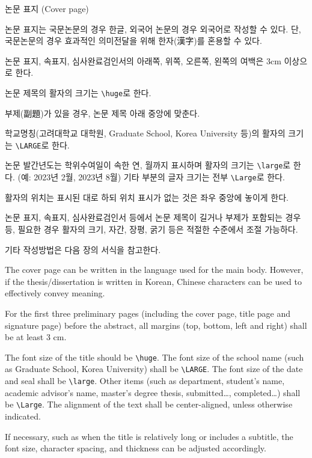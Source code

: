 \documentclass[11pt]{report}
\numberwithin{figure}{section}
\theoremstyle{plain}
\theoremstyle{definition}
\theoremstyle{corollary}
\theoremstyle{definition}
\theoremstyle{plain}
\theoremstyle{definition}
\theoremstyle{plain}
\begin{document}
\onehalfspacing
\renewcommand{\arraystretch}{1.5}

\begin{center}
\large 논문 표지 (Cover page)
\end{center}
논문 표지는 국문논문의 경우 한글, 외국어 논문의 경우 외국어로 작성할 수 있다.
단, 국문논문의 경우 효과적인 의미전달을 위해 한자(漢字)를 혼용할 수 있다.

논문 표지, 속표지, 심사완료검인서의 아래쪽, 위쪽, 오른쪽, 왼쪽의 여백은 3cm 이상으로 한다.

논문 제목의 활자의 크기는 \verb|\huge|로 한다.

부제(副題)가 있을 경우, 논문 제목 아래 중앙에 맞춘다.

학교명칭(고려대학교 대학원, Graduate School, Korea University 등)의 활자의 크기는 \verb|\LARGE|로 한다.

논문 발간년도는 학위수여일이 속한 연, 월까지 표시하며 활자의 크기는 \verb|\large|로 한다. (예: 2023년 2월, 2023년 8월) 
기타 부분의 글자 크기는 전부 \verb|\Large|로 한다.

활자의 위치는 표시된 대로 하되 위치 표시가 없는 것은 좌우 중앙에 놓이게 한다.

논문 표지, 속표지, 심사완료검인서 등에서 논문 제목이 길거나 부제가 포함되는 경우 등, 필요한 경우 활자의 크기, 자간, 장평, 굵기 등은 적절한 수준에서 조절 가능하다.

기타 작성방법은 다음 장의 서식을 참고한다.

\bigskip

The cover page can be written in the language used for the main body.
However, if the thesis/dissertation is written in Korean, Chinese characters can be used to effectively convey meaning.

For the first three preliminary pages (including the cover page, title page and signature page) before the abstract, all margins (top, bottom, left and right) shall be at least 3 cm.

The font size of the title should be \verb|\huge|.
The font size of the school name (such as Graduate School, Korea University) shall be \verb|\LARGE|.
The font size of the date and seal shall be \verb|\large|.
Other items (such as department, student’s name, academic advisor’s name, master’s degree thesis, submitted…, completed…) shall be \verb|\Large|.
The alignment of the text shall be center-aligned, unless otherwise indicated.

If necessary, such as when the title is relatively long or includes a subtitle, the font size, character spacing, and thickness can be adjusted accordingly.
\end{document}

